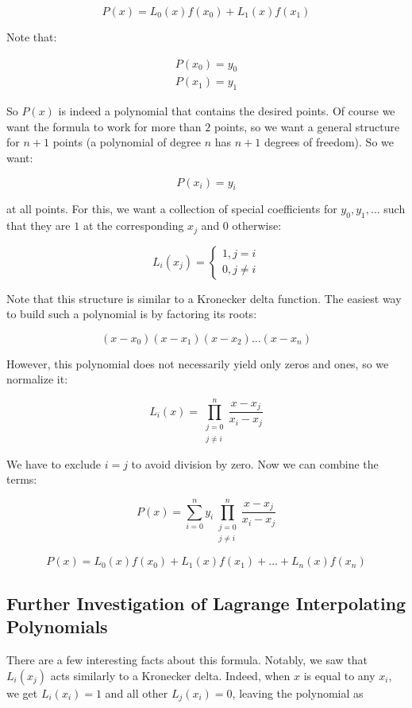 \documentclass[12pt]{article}
\theoremstyle{plain}
\theoremstyle{remark}
\begin{document}
\[
  P(x) = L_0(x)f(x_0) + L_1(x)f(x_1)
\]

Note that:

\begin{gather*}
    P(x_0) = y_0 \\
    P(x_1) = y_1
\end{gather*}

So $P(x)$ is indeed a polynomial that contains the desired points. Of course we want the formula to work for more than $2$ points, so we want a general structure for $n + 1$ points (a polynomial of degree $n$ has $n + 1$ degrees of freedom). So we want:

\[
  P(x_i) = y_i
\]

at all points. For this, we want a collection of special coefficients for $y_0, y_1, \dots$ such that they are $1$ at the corresponding $x_j$ and $0$ otherwise:

\[
  L_i(x_j) =
  \begin{cases}
  1, j = i\\
  0, j \ne i
  \end{cases}
\]

Note that this structure is similar to a Kronecker delta function. The easiest way to build such a polynomial is by factoring its roots:

\[
  (x - x_0)(x - x_1)(x - x_2)\dots(x - x_n)
\]

However, this polynomial does not necessarily yield only zeros and ones, so we normalize it:

\[
  L_i(x) = \prod_{\substack{j = 0 \\ j\ne i}}^n \frac{x - x_j}{x_i - x_j}
\]

We have to exclude $i = j$ to avoid division by zero. Now we can combine the terms:

\[
  P(x) = \sum_{i = 0}^n y_i \prod_{\substack{j = 0 \\ j\ne i}}^n \frac{x - x_j}{x_i - x_j}
\]

\begin{equation}\label{eq:lagrange_interpolation_formula}
  P(x) = L_0(x)f(x_0) + L_1(x)f(x_1) + \dots + L_n(x)f(x_n)
\end{equation}

\subsection{Further Investigation of Lagrange Interpolating Polynomials}

There are a few interesting facts about this formula. Notably, we saw that $L_i(x_j)$ acts similarly to a Kronecker delta. Indeed, when $x$ is equal to any $x_i$, we get $L_i(x_i) = 1$ and all other $L_j(x_i) = 0$, leaving the polynomial as
\end{document}
